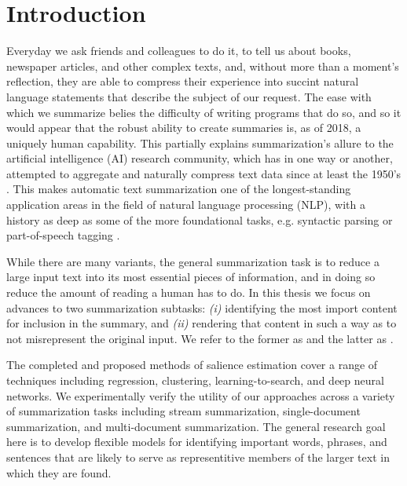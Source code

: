 \section{Introduction}

Everyday we ask friends and colleagues to do it, to tell us about books, 
newspaper articles, and other complex texts, and, without more than a 
moment's reflection, they are able to compress their experience
into succint natural language statements that describe the
subject of our request.
The ease with which we summarize belies the difficulty of
writing programs that do so, and so it would appear that 
the robust
ability to create summaries is, as of 2018, a uniquely human capability.
This partially explains summarization's allure to the artificial intelligence (AI)
research community, which has in one way or another, attempted to aggregate
and naturally compress text data since at least the 1950's 
\citep{luhn1958automatic}.
This makes automatic text summarization one of the longest-standing 
application areas in the 
field of natural language processing (NLP), with a history as deep 
as some of the more foundational tasks, e.g. syntactic parsing 
\citep{yngve1955syntax} or 
part-of-speech tagging \citep{harris1962string}. 

While there are many variants, 
the general summarization task is 
to reduce a large input text into its most essential pieces of information,
and in doing so reduce the amount of reading a human has to do. 
In this thesis we focus on advances to two summarization subtasks:
\textit{(i)} identifying the most import content for inclusion in the summary, 
and \textit{(ii)}
rendering that content in such a way as to not misrepresent the original 
input. We refer to the former as  and the latter
as . 

The completed and proposed methods of salience estimation cover a range of
techniques including regression, clustering, learning-to-search,
and deep neural networks. 
We experimentally verify the utility of our approaches
across a variety of summarization tasks including stream summarization,
single-document summarization, and multi-document summarization.
The general research goal here is to develop flexible models for 
identifying
important words, phrases, and sentences that are likely to serve as 
representitive members of the larger text in which they are found.

